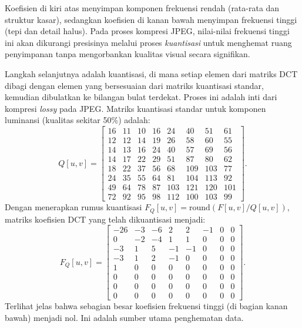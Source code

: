 \documentclass[a4paper]{article}
\begin{document}
Koefisien di kiri atas menyimpan komponen frekuensi rendah (rata-rata dan struktur kasar), sedangkan koefisien di kanan bawah menyimpan frekuensi tinggi (tepi dan detail halus). Pada proses kompresi JPEG, nilai-nilai frekuensi tinggi ini akan dikurangi presisinya melalui proses \textit{kuantisasi} untuk menghemat ruang penyimpanan tanpa mengorbankan kualitas visual secara signifikan.

Langkah selanjutnya adalah kuantisasi, di mana setiap elemen dari matriks DCT dibagi dengan elemen yang bersesuaian dari matriks kuantisasi standar, kemudian dibulatkan ke bilangan bulat terdekat. Proses ini adalah inti dari kompresi \textit{lossy} pada JPEG. Matriks kuantisasi standar untuk komponen luminansi (kualitas sekitar 50\%) adalah:
\[
  Q[u,v] =
  \begin{bmatrix}
    16 & 11 & 10 & 16 & 24  & 40  & 51  & 61  \\
    12 & 12 & 14 & 19 & 26  & 58  & 60  & 55  \\
    14 & 13 & 16 & 24 & 40  & 57  & 69  & 56  \\
    14 & 17 & 22 & 29 & 51  & 87  & 80  & 62  \\
    18 & 22 & 37 & 56 & 68  & 109 & 103 & 77  \\
    24 & 35 & 55 & 64 & 81  & 104 & 113 & 92  \\
    49 & 64 & 78 & 87 & 103 & 121 & 120 & 101 \\
    72 & 92 & 95 & 98 & 112 & 100 & 103 & 99
  \end{bmatrix}.
\]
Dengan menerapkan rumus kuantisasi $F_Q[u,v] = \text{round}(F[u,v] / Q[u,v])$, matriks koefisien DCT yang telah dikuantisasi menjadi:
\[
  F_Q[u,v] =
  \begin{bmatrix}
    -26 & -3 & -6 & 2  & 2  & -1 & 0 & 0 \\
    0   & -2 & -4 & 1  & 1  & 0  & 0 & 0 \\
    -3  & 1  & 5  & -1 & -1 & 0  & 0 & 0 \\
    -3  & 1  & 2  & -1 & 0  & 0  & 0 & 0 \\
    1   & 0  & 0  & 0  & 0  & 0  & 0 & 0 \\
    0   & 0  & 0  & 0  & 0  & 0  & 0 & 0 \\
    0   & 0  & 0  & 0  & 0  & 0  & 0 & 0 \\
    0   & 0  & 0  & 0  & 0  & 0  & 0 & 0
  \end{bmatrix}.
\]
Terlihat jelas bahwa sebagian besar koefisien frekuensi tinggi (di bagian kanan bawah) menjadi nol. Ini adalah sumber utama penghematan data.
\end{document}
